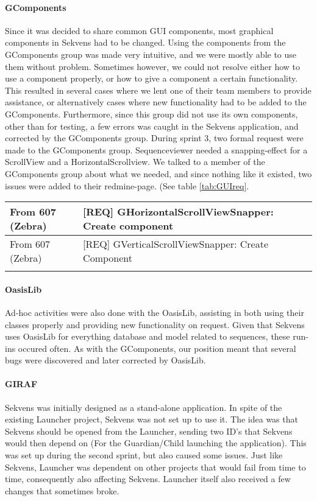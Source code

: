 \paragraph{GComponents}
Since it was decided to share common GUI components, most graphical components in Sekvens had to be changed. Using the components from the GComponents group was made very intuitive, and we were mostly able to use them without problem. Sometimes however, we could not resolve either how to use a component properly, or how to give a component a certain functionality. This resulted in several cases where we lent one of their team members to provide assistance, or alternatively cases where new functionality had to be added to the GComponents. Furthermore, since this group did not use its own components, other than for testing, a few errors was caught in the Sekvens application, and corrected by the GComponents group.\newline
\newline
\label{collaborationSnapper}During sprint 3, two formal request were made to the GComponents group. Sequenceviewer needed a snapping-effect for a ScrollView and a HorizontalScrollview. We talked to a member of the GComponents group about what we needed, and since nothing like it existed, two issues were added to their redmine-page. (See table \ref{tab:GUIreq}. \newline

\begin{tabular}{| l | l |}
  \hline                       
[REQUEST] From 607 (Zebra) & [REQ] GHorizontalScrollViewSnapper: Create component \\ \hline
[REQUEST] From 607 (Zebra) & [REQ] GVerticalScrollViewSnapper: Create Component \\
  \hline  
  \label{tab:GUIreq}
\end{tabular}

\paragraph{OasisLib}
Ad-hoc activities were also done with the OasisLib, assisting in both using their classes properly and providing new functionality on request. Given that Sekvens uses OasisLib for everything database and model related to sequences, these run-ins occured often. As with the GComponents, our position meant that several bugs were discovered and later corrected by OasisLib.

\paragraph{GIRAF}
Sekvens was initially designed as a stand-alone application. In spite of the existing Launcher project, Sekvens was not set up to use it. The idea was that Sekvens should be opened from the Launcher, sending two ID's that Sekvens would then depend on (For the Guardian/Child launching the application). This was set up during the second sprint, but also caused some issues. Just like Sekvens, Launcher was dependent on other projects that would fail from time to time, consequently also affecting Sekvens. Launcher itself also received a few changes that sometimes broke.

